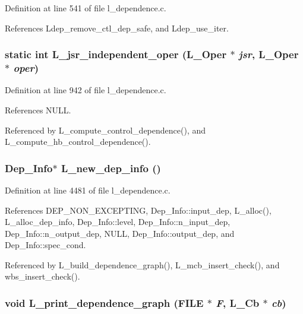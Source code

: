Definition at line 541 of file l\_\-dependence.c.

References Ldep\_\-remove\_\-ctl\_\-dep\_\-safe, and Ldep\_\-use\_\-iter.
\subsubsection{\setlength{\rightskip}{0pt plus 5cm}static int L\_\-jsr\_\-independent\_\-oper (L\_\-Oper $\ast$ {\em jsr}, L\_\-Oper $\ast$ {\em oper})\hspace{0.3cm}{\tt  [static]}}\label{l__dependence_8c_a451ec761845e8b8d2f946aeab814fb4}




Definition at line 942 of file l\_\-dependence.c.

References NULL.

Referenced by L\_\-compute\_\-control\_\-dependence(), and L\_\-compute\_\-hb\_\-control\_\-dependence().
\subsubsection{\setlength{\rightskip}{0pt plus 5cm}\bf{Dep\_\-Info}$\ast$ L\_\-new\_\-dep\_\-info ()}\label{l__dependence_8c_36f50b716086eefdc8b0f60e72e98f71}




Definition at line 4481 of file l\_\-dependence.c.

References DEP\_\-NON\_\-EXCEPTING, Dep\_\-Info::input\_\-dep, L\_\-alloc(), L\_\-alloc\_\-dep\_\-info, Dep\_\-Info::level, Dep\_\-Info::n\_\-input\_\-dep, Dep\_\-Info::n\_\-output\_\-dep, NULL, Dep\_\-Info::output\_\-dep, and Dep\_\-Info::spec\_\-cond.

Referenced by L\_\-build\_\-dependence\_\-graph(), L\_\-mcb\_\-insert\_\-check(), and wbs\_\-insert\_\-check().
\subsubsection{\setlength{\rightskip}{0pt plus 5cm}void L\_\-print\_\-dependence\_\-graph (FILE $\ast$ {\em F}, L\_\-Cb $\ast$ {\em cb})}\label{l__dependence_8c_585e04c6115d5b91dd8005ef9cd031fa}




